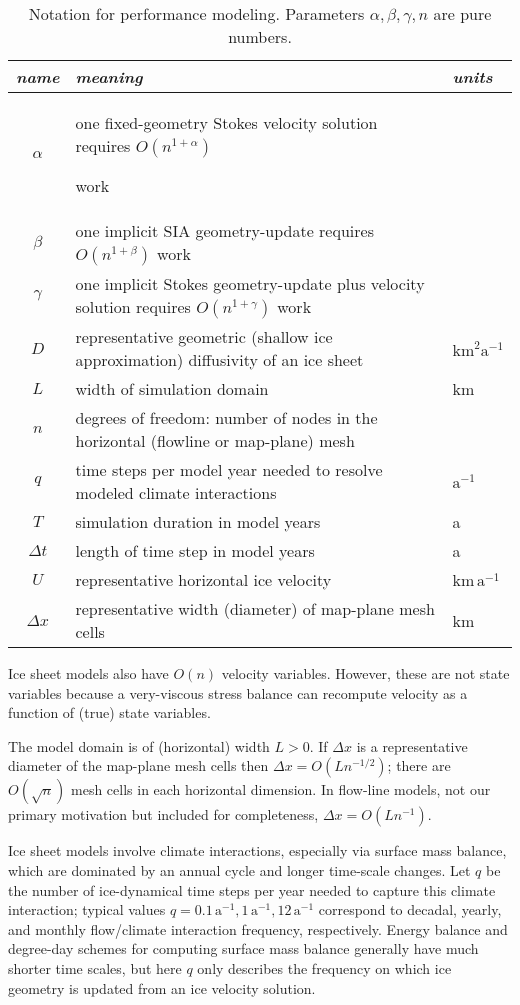 \documentclass[twocolumn,letterpaper]{igs}
\begin{document}
\begin{table*}[ht]
\begin{tabular}{cll}
\emph{name} & \emph{meaning} & \emph{units} \\ \hline
$\alpha$    & one fixed-geometry Stokes velocity solution requires $O(n^{1+\alpha})${\large \strut} work\\
$\beta$     & one implicit SIA geometry-update requires $O(n^{1+\beta})$ work \\
$\gamma$    & one implicit Stokes geometry-update plus velocity solution requires $O(n^{1+\gamma})$ work \\
$D$         & representative geometric (shallow ice approximation) diffusivity of an ice sheet & $\text{km}^2 \text{a}^{-1}$ \\
$L$         & width of simulation domain & km \\
$n$         & degrees of freedom: number of nodes in the horizontal (flowline or map-plane) mesh \\
$q$         & time steps per model year needed to resolve modeled climate interactions & $\text{a}^{-1}$ \\
$T$         & simulation duration in model years & a \\
$\Delta t$  & length of time step in model years & a \\
$U$         & representative horizontal ice velocity & $\text{km}\,\text{a}^{-1}$ \\
$\Delta x$  & representative width (diameter) of map-plane mesh cells & km
\end{tabular}
\caption{Notation for performance modeling.  Parameters $\alpha,\beta,\gamma,n$ are pure numbers.}
\label{tab:notation}
\end{table*}

Ice sheet models also have $O(n)$ velocity variables.  However, these are not state variables because a very-viscous stress balance can recompute velocity as a function of (true) state variables.

The model domain is of (horizontal) width $L>0$.  If $\Delta x$ is a representative diameter of the map-plane mesh cells then $\Delta x = O(L n^{-1/2})$; there are $O(\sqrt{n})$ mesh cells in each horizontal dimension.  In flow-line models, not our primary motivation but included for completeness, $\Delta x = O(L n^{-1})$.
 
Ice sheet models involve climate interactions, especially via surface mass balance, which are dominated by an annual cycle and longer time-scale changes.  Let $q$ be the number of ice-dynamical time steps per year needed to capture this climate interaction; typical values $q=0.1 \,\text{a}^{-1}, 1 \,\text{a}^{-1}, 12 \,\text{a}^{-1}$ correspond to decadal, yearly, and monthly flow/climate interaction frequency, respectively.  Energy balance and degree-day schemes for computing surface mass balance generally have much shorter time scales, but here $q$ only describes the frequency on which ice geometry is updated from an ice velocity solution.
\end{document}
